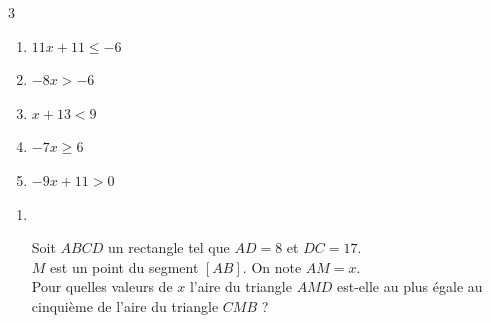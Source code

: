 {\begin{Exercice}
\begin{multicols}{3}
\begin{enumerate}[itemsep=1.5em]
	\item \begin{minipage}[t]{\linewidth}$11x+11\leqslant-6$\\\end{minipage}
	\item \begin{minipage}[t]{\linewidth}$-8x>-6$\\\end{minipage}
	\item \begin{minipage}[t]{\linewidth}$x+13<9$\\\end{minipage}
	\item \begin{minipage}[t]{\linewidth}$-7x\geqslant6$\\\end{minipage}
	\item \begin{minipage}[t]{\linewidth}$-9x+11>0$\\\end{minipage}
\end{enumerate}
\end{multicols}
\end{Exercice}

\begin{Exercice}
\leavevmode\vspace{-\baselineskip}
\begin{enumerate}[itemsep=1.5em]
	\item $ $ \begin{minipage}[c]{0.6\linewidth} Soit $ABCD$ un rectangle tel que $AD=8$ et $DC=17$.\\
            $M$ est un point du segment $[AB]$. On note $AM=x$.\\
            Pour quelles valeurs de $x$ l'aire du triangle $AMD$ est-elle au plus égale au cinquième de l'aire du triangle $CMB$ ? \end{minipage} \hfill \begin{minipage}[c]{0.4\linewidth}
     \begin{center}

              \begin{tikzpicture}[baseline,scale = 0.5]


\end{tikzpicture}
\end{center}
\end{minipage}
\end{enumerate}
\end{Exercice}}
